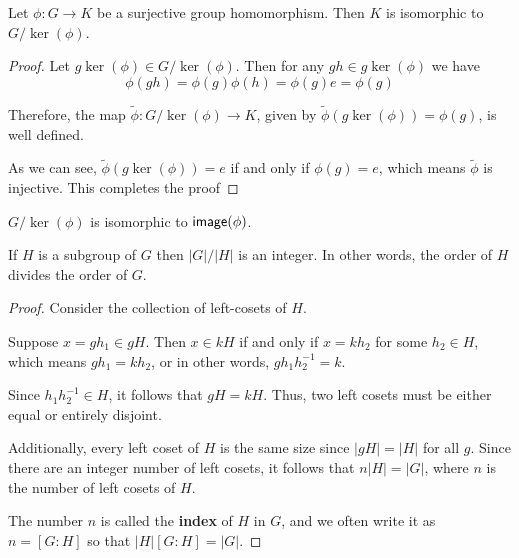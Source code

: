 \begin{thm}
    Let $\phi : G \to K$ be a surjective group homomorphism. Then $K$ is isomorphic to $G/\ker(\phi)$.
\end{thm}
\begin{proof}
    Let $g\ker(\phi) \in G/\ker(\phi)$. Then for any $gh \in g\ker(\phi)$ we have \[\phi(gh) = \phi(g)\phi(h) = \phi(g)e = \phi(g)\]

    Therefore, the map $\tilde{\phi} : G/\ker(\phi) \to K$, given by $\tilde{\phi}(g\ker(\phi)) = \phi(g)$, is well defined.
    
    As we can see, $\tilde{\phi}(g\ker(\phi)) = e$ if and only if $\phi(g) = e$, which means $\tilde{\phi}$ is injective. This completes the proof
\end{proof}
\begin{cor}
    $G/\ker(\phi)$ is isomorphic to $\operatorname{\textsf{image}}(\phi)$.
\end{cor}
\begin{thm}
    If $H$ is a subgroup of $G$ then $|G|/|H|$ is an integer. In other words, the order of $H$ divides the order of $G$.
\end{thm}
\begin{proof}
    Consider the collection of left-cosets of $H$. 
    
    Suppose $x=gh_1 \in gH$. Then $x \in kH$ if and only if $x = kh_2$ for some $h_2\in H$, which means $gh_1 = kh_2$, or in other words, $gh_1h_2^{-1}=k$. 
    
    Since $h_1h_2^{-1} \in H$, it follows that $gH = kH$. Thus, two left cosets must be either equal or entirely disjoint. 
    
    Additionally, every left coset of $H$ is the same size since $|gH| = |H|$ for all $g$. Since there are an integer number of left cosets, it follows that $n|H|=|G|$, where $n$ is the number of left cosets of $H$.
    
    The number $n$ is called the \textbf{index} of $H$ in $G$, and we often write it as $n = [G:H]$ so that $|H|[G:H] = |G|$.
\end{proof}

